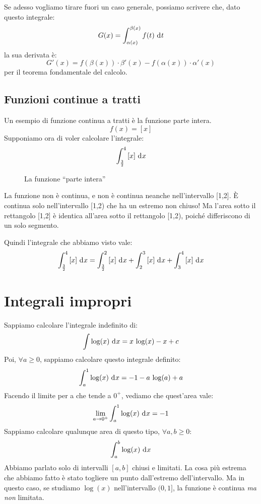 Se adesso vogliamo tirare fuori un caso generale, possiamo scrivere che, dato questo integrale:
\[
G(x) = \int_{\alpha (x)}^{\beta (x)} f(t) \dx[t]
\]
la sua derivata \`e:
\[
G'(x) = f(\beta(x)) \cdot \beta'(x) - f(\alpha(x)) \cdot \alpha'(x)
\]
per il teorema fondamentale del calcolo.

\subsection{Funzioni continue a tratti}

Un esempio di funzione continua a tratti \`e la funzione parte intera.
\[
f(x) = \left[ x \right]
\]
Supponiamo ora di voler calcolare l'integrale:
\[
\int_{\frac{3}{2}}^{4} \left[ x \right] \dx
\]
\begin{figure}[h]
\centering
{}
\caption{La funzione ``parte intera''}
\end{figure}

La funzione non \`e continua, e non \`e continua neanche nell'intervallo [1,2]. \`E continua solo nell'intervallo [1,2) che ha un estremo non chiuso! Ma l'area sotto il rettangolo [1,2] \`e identica all'area sotto il rettangolo [1,2), poich\'e differiscono di un solo segmento.

Quindi l'integrale che abbiamo visto vale:
\[
\int_{\frac{3}{2}}^{4} \left[ x \right] \dx =
\int_{\frac{3}{2}}^{2} \left[ x \right] \dx +
\int_{2}^{3} \left[ x \right] \dx +
\int_{3}^{4} \left[ x \right] \dx
\]

\section{Integrali impropri}

Sappiamo calcolare l'integrale indefinito di:
\[
\int \log (x) \dx = x \, \log (x) - x + c
\]
Poi, $\forall a \ge 0$, sappiamo calcolare questo integrale definito:
\[
\int_{a}^{1} \log (x) \dx = - 1 - a \, \log (a) + a
\]
Facendo il limite per a che tende a $0^+$, vediamo che quest'area vale:
\[
\lim_{a \to 0^+} \int_{a}^{1} \log (x) \dx = -1
\]
Sappiamo calcolare qualunque area di questo tipo, $\forall a, b \ge 0$:
\[
\int_{a}^{b} \log (x) \dx
\]
Abbiamo parlato solo di intervalli $[a,b]$ chiusi e limitati. La cosa pi\`u estrema che abbiamo fatto \`e stato togliere un punto dall'estremo dell'intervallo. Ma in questo caso, se studiamo $\log (x)$ nell'intervallo $(0,1]$, la funzione \`e continua \emph{ma non} limitata.

